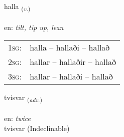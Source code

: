 \documentclass[frontgrid, backgrid]{flacards}\usepackage[]{graphicx}\usepackage[]{color}
\begin{document}
\renewcommand{\flhead}{\vskip5pt \fboxsep=0pt {\small\bfseries\footnotesize Sagnorð | Verb}}
\renewcommand{\fcfoot}{\vskip5pt \fboxsep=0pt \hspace{2pt}{\small\bfseries\footnotesize 2K}}

\renewcommand{\blhead}{\vskip5pt {\small\bfseries\footnotesize Sagnorð | Verb }}
\renewcommand{\bcfoot}{\vskip5pt \hspace{2pt}{\small\bfseries\footnotesize 2K}}


{halla \small{\textsubscript{(\textit{v.})}} \\[1ex] %
\textphonetic{[hatla]} \\
en: \emph{tilt, tip up, lean} \\  [2ex]
\renewcommand*{\arraystretch}{0.8}
\begin{tabular}{p{1cm}l}
\textsc{1sg}: & halla -- hallaði -- hallað \\ 
\textsc{2sg}: & hallar -- hallaðir -- hallað \\ 
\textsc{3sg}: & hallar -- hallaði -- hallað \\ 
\end{tabular}
}


\renewcommand{\flhead}{\vskip5pt \fboxsep=0pt {\small\bfseries\footnotesize Atviksorð | Adverb}}
\renewcommand{\fcfoot}{\vskip5pt \fboxsep=0pt \hspace{2pt}{\small\bfseries\footnotesize 2K}}

\renewcommand{\blhead}{\vskip5pt {\small\bfseries\footnotesize Atviksorð | Adverb }}
\renewcommand{\bcfoot}{\vskip5pt \hspace{2pt}{\small\bfseries\footnotesize 2K}}


{tvisvar \small{\textsubscript{(\textit{adv.})}} \\[1ex]
\textphonetic{[tʰvɪːsvar]} \\
en: \emph{twice} \\  [2ex]
tvisvar (Indeclinable)}
\end{document}
